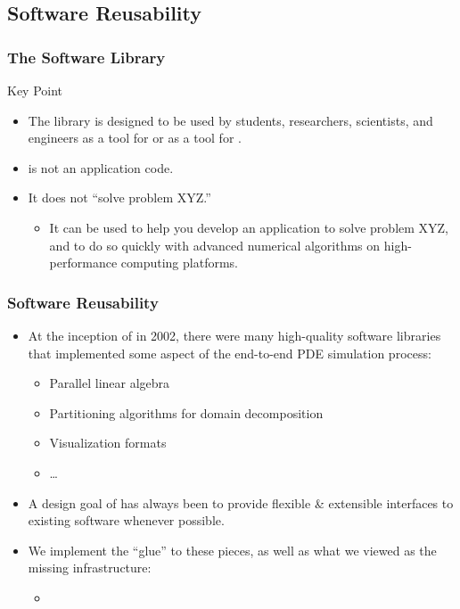 \subsection{Software Reusability}
\frame
{
  \frametitle{The \libmesh{} Software Library}

  \begin{block}{Key Point}
    \begin{itemize}
      \item The \libmesh{} library is designed to be used by students, researchers, scientists, and engineers as a tool for  or as a tool for .
      \item \libMesh{} is not an application code.
      \item It does not ``solve problem XYZ.''
        \begin{itemize}
          \item It can be used to help you develop an application to solve problem XYZ, and to do so quickly with advanced numerical algorithms on high-performance computing platforms.
        \end{itemize}
    \end{itemize}
  \end{block}
}



\frame
{
  \frametitle{Software Reusability}
  \begin{itemize}
    \item At the inception of \libMesh{} in 2002, there were many high-quality software libraries that implemented some aspect of the end-to-end PDE simulation process:
      \begin{itemize}
        \item Parallel linear algebra
        \item Partitioning algorithms for domain decomposition
        \item Visualization formats
        \item \ldots
      \end{itemize}
    \item A design goal of \libMesh{} has always been to provide flexible \& extensible interfaces to existing software whenever possible.
    \item We implement the ``glue'' to these pieces, as well as what we viewed as the missing infrastructure:
      \begin{itemize}
        \item {}
      \end{itemize}
  \end{itemize}
}



